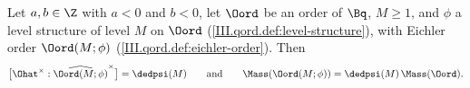 Let $a,b\in\Z$ with $a<0$ and $b<0$, let $\Oord$ be an order of $\Bq$, $M\ge1$, and $\phi$ a level structure of level $M$ on $\Oord$
(\cref{III.qord.def:level-structure}), with Eichler order $\Oord(M;\phi)$ (\cref{III.qord.def:eichler-order}). Then
\[
  \bigl[\Ohat^\times:\widehat{\Oord(M;\phi)}^\times\bigr]=\dedpsi(M)\qquad\text{and}\qquad\Mass(\Oord(M;\phi))=\dedpsi(M)\,\Mass(\Oord).
\]
